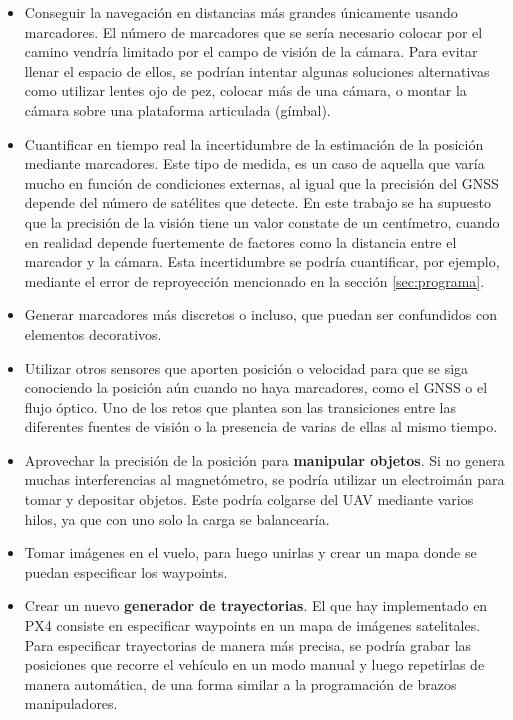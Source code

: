 	\begin{itemize}
	\item Conseguir la navegación en distancias más grandes únicamente usando marcadores. El número de marcadores que se sería necesario colocar por el camino vendría limitado por el campo de visión de la cámara. Para evitar llenar el espacio de ellos, se podrían intentar algunas soluciones alternativas como utilizar lentes ojo de pez, colocar más de una cámara, o montar la cámara sobre una plataforma articulada (gímbal).    


	\item Cuantificar en tiempo real la incertidumbre de la estimación de la posición mediante marcadores. Este tipo de medida, es un caso de aquella que varía mucho en función de condiciones externas, al igual que la precisión del GNSS depende del número de satélites que detecte. En este trabajo se ha supuesto que la precisión de la visión tiene un valor constate de un centímetro, cuando en realidad depende fuertemente de factores como la distancia entre el marcador y la cámara. Esta incertidumbre se podría cuantificar, por ejemplo, mediante el error de reproyección mencionado en la sección \ref{sec:programa}.

	\item Generar marcadores más discretos o incluso, que puedan ser confundidos con elementos decorativos.

	\item Utilizar otros sensores que aporten posición o velocidad para que se siga conociendo la posición aún cuando no haya marcadores, como el GNSS o el flujo óptico. Uno de los retos que plantea son las transiciones entre las diferentes fuentes de visión o la presencia de varias de ellas al mismo tiempo. 

	\item Aprovechar la precisión de la posición para \textbf{manipular objetos}. Si no genera muchas interferencias al magnetómetro, se podría utilizar un electroimán para tomar y depositar objetos. Este podría colgarse del UAV mediante varios hilos, ya que con uno solo la carga se balancearía. 

	\item Tomar imágenes en el vuelo, para luego unirlas y crear un mapa donde se puedan especificar los waypoints. 

	\item Crear un nuevo \textbf{generador de trayectorias}. El que hay implementado en PX4 consiste en especificar waypoints en un mapa de imágenes satelitales. Para especificar trayectorias de manera más precisa, se podría grabar las posiciones que recorre el vehículo en un modo manual y luego repetirlas de manera automática, de una forma similar a la programación de brazos manipuladores.  
	\end{itemize}


\endinput

